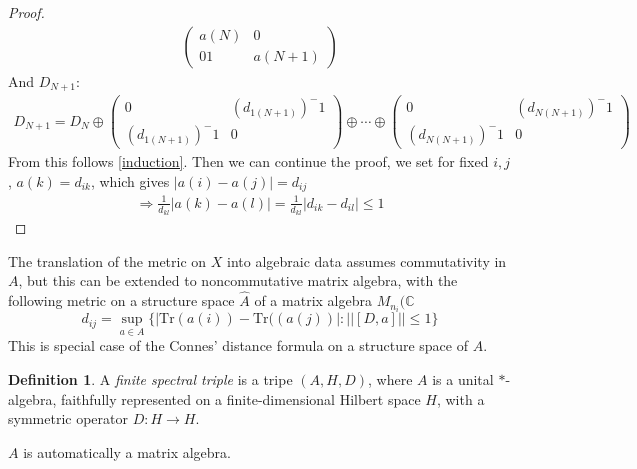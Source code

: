 \documentclass[a4paper]{article}
\theoremstyle{definition}
\newtheorem{definition}{Definition}
\theoremstyle{definition}
\theoremstyle{definition}
\theoremstyle{theorem}
\theoremstyle{theorem}
\theoremstyle{definition}
\begin{document}
\begin{proof}
\begin{align}
        \begin{pmatrix}
            a(N) & 0 \\
            0  1 & a(N+1)
        \end{pmatrix}
    \end{align}
    And $D_{N+1}$:
    \begin{align}
        D_{N+1} = D_N
        \oplus
        \begin{pmatrix}
            0 & (d_{1(N+1)})^-1 \\
            (d_{1(N+1)})^-1   & 0
        \end{pmatrix}
        \oplus \cdots \oplus
        \begin{pmatrix}
            0 & (d_{N(N+1)})^-1 \\
            (d_{N(N+1)})^-1   & 0
        \end{pmatrix}
    \end{align}
    From this follows \ref{induction}.
    Then we can continue the proof, we set for fixed $i, j$, $a(k) = d_{ik}$, which gives
    $|a(i) - a(j)| = d_{ij}$
    \begin{align}
        \Rightarrow  \frac{1}{d_{kl}} | a(k) - a(l) | =  \frac{1}{d_{kl}} | d_{ik} - d_{il} | \leq 1
    \end{align}
\end{proof}

The translation of the metric on $X$ into algebraic data assumes commutativity in $A$, but this can be
extended to noncommutative matrix algebra, with the following metric on a structure space $\hat{A}$
of a matrix algebra $M_{n_i}(\mathbb{C}$
\begin{equation}
    d_{ij} = \sup_{a\in A}\big\{|\text{Tr}(a(i)) - \text{Tr}((a(j))|: ||[D, a]|| \leq 1\big\}
\end{equation}
This is special case of the Connes' distance formula on a structure space of $A$.

\begin{definition}
    A \textit{finite spectral triple} is a tripe $(A, H, D)$, where $A$ is a unital $*$-algebra,
    faithfully represented on a finite-dimensional Hilbert space $H$, with a symmetric operator
    $D: H \rightarrow H$.
\end{definition}
$A$ is automatically a matrix algebra.
\end{document}
